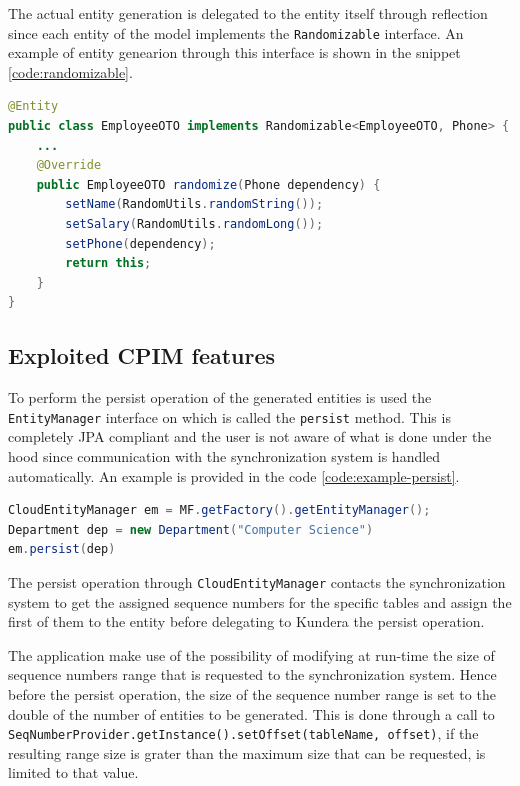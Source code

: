 \noindent The actual entity generation is delegated to the entity itself through reflection since each entity of the model implements the \texttt{Randomizable} interface.
An example of entity genearion through this interface is shown in the snippet \ref{code:randomizable}.

\begin{lstlisting}[language=Java, caption=Entities generation, label=code:randomizable]
@Entity
public class EmployeeOTO implements Randomizable<EmployeeOTO, Phone> {
    ...
    @Override
    public EmployeeOTO randomize(Phone dependency) {
        setName(RandomUtils.randomString());
        setSalary(RandomUtils.randomLong());
        setPhone(dependency);
        return this;
    }
}
\end{lstlisting}
 
\subsection{Exploited CPIM features}
To perform the persist operation of the generated entities is used the \texttt{EntityManager} interface on which is called the \texttt{persist} method. This is completely JPA compliant and the user is not aware of what is done under the hood since communication with the synchronization system is handled automatically. An example is provided in the code \ref{code:example-persist}.

\begin{lstlisting}[language=Java, caption=Persisting entities in CPIM, label=code:example-persist]
CloudEntityManager em = MF.getFactory().getEntityManager();
Department dep = new Department("Computer Science")
em.persist(dep)
\end{lstlisting}

\noindent The persist operation through \texttt{CloudEntityManager} contacts the synchronization system to get the assigned sequence numbers for the specific tables and assign the first of them to the entity before delegating to Kundera the persist operation.

\newparagraph The application make use of the possibility of modifying at run-time the size of sequence numbers range that is requested to the synchronization system. Hence before the persist operation, the size of the sequence number range is set to the double of the number of entities to be generated. This is done through a call to \texttt{SeqNumberProvider.getInstance().setOffset(tableName, offset)}, if the resulting range size is grater than the maximum size that can be requested, is limited to that value. 

